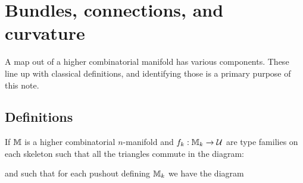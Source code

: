 \section{Bundles, connections, and curvature}
A map out of a higher combinatorial manifold has various components. These line up with classical definitions, and identifying those is a primary purpose of this note.

\subsection{Definitions}

\begin{mydef}
\label{def:connection}
If \( \mathbb{M} \) is a higher combinatorial \( n \)-manifold and \( f_k:\mathbb{M}_k\to\mathcal{U} \) are type families on each skeleton such that all the triangles commute in the diagram:
\end{mydef}
\begin{center}
\end{center}
and such that for each pushout defining \( \mathbb{M}_k \) we have the diagram

